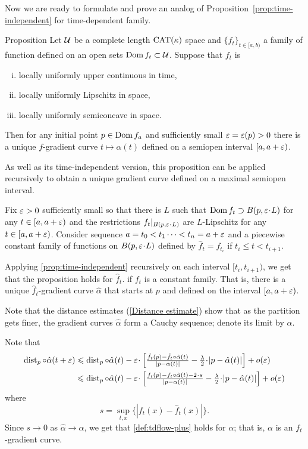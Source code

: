 \documentclass[oneside,a4paper, 12pt]{article}
\begin{document}
Now we are ready to formulate and prove an analog of Proposition~\ref{prop:time-independent} for time-dependent family.

\begin{thm}{Proposition}\label{prop:time-dependent}
Let $\mathcal{U}$ be a complete length $\mathrm{CAT}(\kappa)$ space and
$\{f_t\}_{t\in[a,b)}$ a family of function defined on an open sets $\mathop{\rm Dom}\nolimits f_t\subset {\mathcal{U}}$.
Suppose that $f_t$ is
\begin{enumerate}[(i)]
\item locally uniformly upper continuous in time,
\item locally uniformly Lipschitz in space,
\item locally uniformly semiconcave in space.
\end{enumerate}
Then for any initial point $p\in \mathop{\rm Dom}\nolimits f_a$ and sufficiently small $\varepsilon=\varepsilon(p)>0$ there is a unique $f$-gradient curve $t\mapsto\alpha(t)$ defined on a semiopen interval $[a,a+\varepsilon)$. 
\end{thm}

As well as its time-independent version, this proposition can be applied recursively to obtain a unique gradient curve defined on a maximal semiopen interval.

Fix $\varepsilon>0$ sufficiently small so that there is $L$ such that $\Dom f_t\supset B(p,\eps\cdot L)$ for any $t\in[a,a+\varepsilon)$ and the restrictions $f_t|_{B(p,\eps\cdot L)}$ are $L$-Lipschitz for any $t\in[a,a+\varepsilon)$.
Consider sequence  $a=t_0<t_1\dots<t_n\z=a+\eps$ and a piecewise constant family of functions on $B(p,\eps\cdot L)$ defined by $\hat f_t=f_{t_i}$ if $t_i\le t<t_{i+1}$.

Applying \ref{prop:time-independent} recursively on each interval $[t_i,t_{i+1})$, we get that the proposition holds for $\hat f_t$.
if $f_t$ is a constant family.
That is, there is a unique $\hat f_t$-gradient curve $\hat \alpha$ that starts at $p$ and defined on the interval $[a,a+\varepsilon)$.

Note that the distance estimates (\ref{Distance estimate}) show that as the partition gets finer, the gradient curves $\hat\alpha$ form a Cauchy sequence; denote its limit by $\alpha$.

Note that 
\begin{align*}
\dist_p\circ\hat\alpha(t+\eps)
&\le 
\dist_p\circ\hat\alpha(t)
-\eps\cdot \left[\tfrac{\hat f_t(p)-\hat f_t\circ\hat\alpha(t)}{|p-\alpha(t)|}-\tfrac\lambda2\cdot |p-\hat\alpha(t)|\right]
+o(\eps)
\\
&\le 
\dist_p\circ\hat\alpha(t)
-\eps\cdot \left[\tfrac{f_t(p)-f_t\circ\hat\alpha(t)-2\cdot s}{|p-\alpha(t)|}-\tfrac\lambda2\cdot |p-\hat\alpha(t)|\right]
+o(\eps)
\end{align*}
where 
\[s=\sup_{t,x} \{|f_t(x)-\hat f_t(x)|\}.\]
Since $s\to 0$ as $\hat\alpha\to \alpha$, we get that \ref{def:tdflow-plus} holds for $\alpha$;
that is, $\alpha$ is an $f_t$-gradient curve.
\qeds
\end{document}
